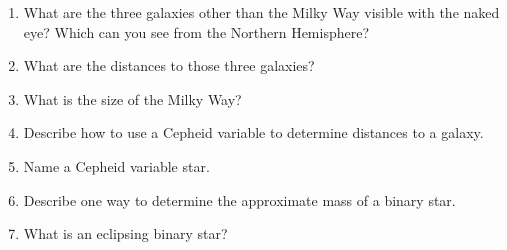 
\begin{enumerate}
\item What are the three galaxies other than the Milky Way visible with
  the naked eye? Which can you see from the Northern Hemisphere?
\vspace{80pt}
\item What are the distances to those three galaxies?
\vspace{80pt}
\item What is the size of the Milky Way?
\vspace{80pt}
\item Describe how to use a Cepheid variable to determine distances to
  a galaxy.
\vspace{80pt}
\item Name a Cepheid variable star.
\vspace{80pt}
\item Describe one way to determine the approximate mass of a binary
  star.
\vspace{80pt}
\item What is an eclipsing binary star?
\vspace{80pt}
\end{enumerate}
